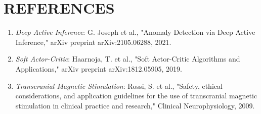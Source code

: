 \documentclass{article}
\begin{document}
\section*{REFERENCES}
\begin{enumerate}
    \item \textit{Deep Active Inference}: G. Joseph et al., "Anomaly Detection via Deep Active Inference," arXiv preprint arXiv:2105.06288, 2021.
    \item \textit{Soft Actor-Critic}: Haarnoja, T. et al., "Soft Actor-Critic Algorithms and Applications," arXiv preprint arXiv:1812.05905, 2019.
    \item \textit{Transcranial Magnetic Stimulation}: Rossi, S. et al., "Safety, ethical considerations, and application guidelines for the use of transcranial magnetic stimulation in clinical practice and research," Clinical Neurophysiology, 2009.
\end{enumerate}
\end{document}
